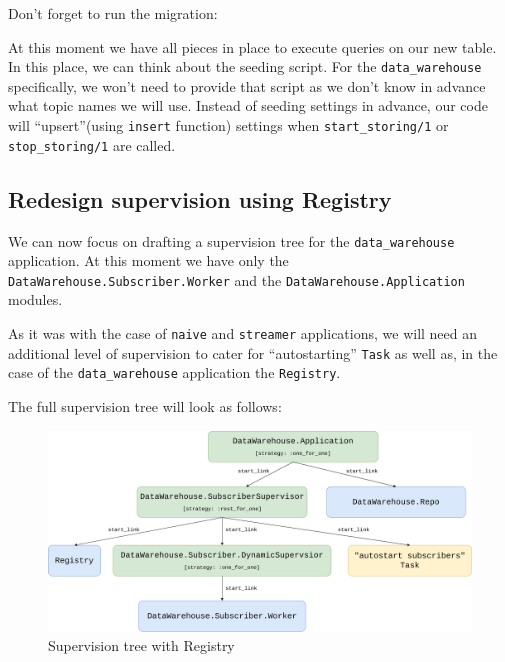 \documentclass[
  oneside]{book}
\newenvironment{Shaded}{\begin{snugshade}}{\end{snugshade}}
\newcommand{\ExtensionTok}[1]{#1}
\newcommand{\NormalTok}[1]{#1}
\begin{document}
Don't forget to run the migration:

\begin{Shaded}
\end{Shaded}

At this moment we have all pieces in place to execute queries on our new table. In this place, we can think about the seeding script. For the \texttt{data\_warehouse} specifically, we won't need to provide that script as we don't know in advance what topic names we will use. Instead of seeding settings in advance, our code will ``upsert''(using \texttt{insert} function) settings when \texttt{start\_storing/1} or \texttt{stop\_storing/1} are called.

\hypertarget{redesign-supervision-using-registry}{%
\subsection{Redesign supervision using Registry}\label{redesign-supervision-using-registry}}

We can now focus on drafting a supervision tree for the \texttt{data\_warehouse} application. At this moment we have only the \texttt{DataWarehouse.Subscriber.Worker} and the \texttt{DataWarehouse.Application} modules.

As it was with the case of \texttt{naive} and \texttt{streamer} applications, we will need an additional level of supervision to cater for ``autostarting'' \texttt{Task} as well as, in the case of the \texttt{data\_warehouse} application the \texttt{Registry}.

The full supervision tree will look as follows:

\begin{figure}
\centering
\includegraphics{images/chapter_14_01_sup_diagram.png}
\caption{Supervision tree with Registry}
\end{figure}
\end{document}
